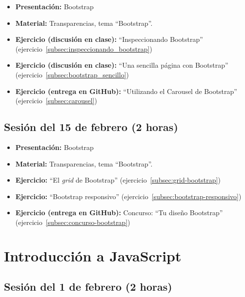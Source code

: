 \documentclass[a4paper,12pt]{report}
\begin{document}
\begin{itemize}
\item \textbf{Presentación:} Bootstrap
\item \textbf{Material:} Transparencias, tema ``Bootstrap''.
\item \textbf{Ejercicio (discusión en clase):} ``Inspeccionando Bootstrap'' (ejercicio~\ref{subsec:inspeccionando_bootstrap})
\item \textbf{Ejercicio (discusión en clase):} ``Una sencilla página con Bootstrap'' (ejercicio~\ref{subsec:bootstrap_sencillo})
\item \textbf{Ejercicio (entrega en GitHub):} ``Utilizando el Carousel de Bootstrap'' (ejercicio~\ref{subsec:carousel})

\end{itemize}

\subsection{Sesión del 15 de febrero (2 horas)}

\begin{itemize}
\item \textbf{Presentación:} Bootstrap
\item \textbf{Material:} Transparencias, tema ``Bootstrap''.
\item \textbf{Ejercicio:} ``El \emph{grid} de Bootstrap'' (ejercicio~\ref{subsec:grid-bootstrap})
\item \textbf{Ejercicio:} ``Bootstrap responsivo'' (ejercicio~\ref{subsec:bootstrap-responsivo})
\item \textbf{Ejercicio (entrega en GitHub):} Concurso: ``Tu diseño Bootstrap'' (ejercicio~\ref{subsec:concurso-bootstrap})
\end{itemize}




\section{Introducción a JavaScript}

\subsection{Sesión del 1 de febrero (2 horas)}
\end{document}
